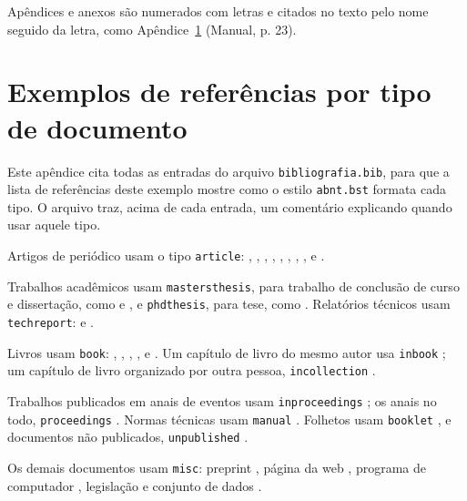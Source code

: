\documentclass[eq,capa]{texufpel}
\begin{document}
Apêndices e anexos são numerados com letras e citados no texto pelo nome
seguido da letra, como Apêndice~\ref{apx:referencias} (Manual, p. 23).

\chapter{Exemplos de referências por tipo de documento}
\label{apx:referencias}

Este apêndice cita todas as entradas do arquivo \texttt{bibliografia.bib},
para que a lista de referências deste exemplo mostre como o estilo
\texttt{abnt.bst} formata cada tipo. O arquivo traz, acima de cada entrada, um
comentário explicando quando usar aquele tipo.

Artigos de periódico usam o tipo \texttt{article}:
\citet{Turing:1937:OCN}, \citet{Turing:1950:CMI}, \citet{Shannon:1948:MTC},
\citet{Dijkstra:1959:NTP}, \citet{Dijkstra:1968:GTS}, \citet{Hoare:1969:ABC},
\citet{Codd:1970:RMD}, \citet{Lamport:1978:TCO},
\citet{Dantzig:1959:TDP} e \citet{Solomon:1987:AVR}.

Trabalhos acadêmicos usam \texttt{mastersthesis}, para trabalho de conclusão
de curso e dissertação, como \citet{Cruz:2015:FCS} e \citet{Shannon:1940:SAR},
e \texttt{phdthesis}, para tese, como \citet{Turing:1938:SLO}. Relatórios
técnicos usam \texttt{techreport}: \citet{vonNeumann:1945:FDR} e
\citet{Postel:1981:IP}.

Livros usam \texttt{book}: \citet{vonNeumann:1966:TSR},
\citet{Knuth:1997:ACP}, \citet{Cormen:2022:IA}, \citet{Brooks:1975:MMM},
\citet{Abelson:1996:SIC} e \citet{Moore:1979:MAI}. Um capítulo de livro do
mesmo autor usa \texttt{inbook} \citep{Knuth:1997:IS}; um capítulo de livro
organizado por outra pessoa, \texttt{incollection}
\citep{vonNeumann:1951:GLT}.

Trabalhos publicados em anais de eventos usam \texttt{inproceedings}
\citep{Cook:1971:CTP}; os anais no todo, \texttt{proceedings}
\citep{ACM:1971:STOC}. Normas técnicas usam \texttt{manual}
\citep{ABNT:2018:NBR6023}. Folhetos usam \texttt{booklet}
\citep{Zorzo:2017:RFC}, e documentos não publicados, \texttt{unpublished}
\citep{Dijkstra:1988:CRT}.

Os demais documentos usam \texttt{misc}: preprint
\citep{Vaswani:2017:AIA}, página da web \citep{ACM:2026:TA}, programa de
computador \citep{Aguiar:2026:TEX}, legislação \citep{Brasil:2015:LBI} e
conjunto de dados \citep{Fisher:1936:IRI}.

\anexos
\end{document}
